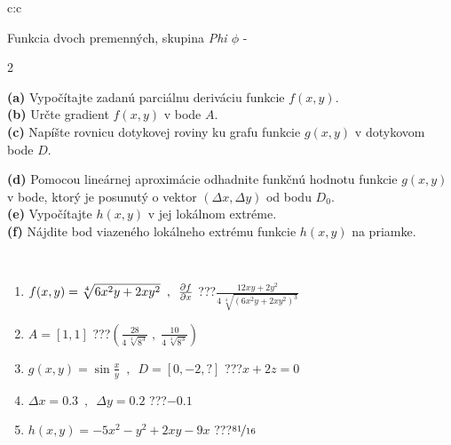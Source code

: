 \documentclass[10pt]{report}
\begin{document}
\begin{tabular}{c:c}
\begin{minipage}[c][104.5mm][t]{0.5\linewidth}
\begin{center}
\vspace{7mm}
{\huge \LARGE Funkcia dvoch premenných, skupina \textit{Phi $\phi$} -}\\[5mm]
\begin{minipage}{0.95\linewidth}
\begin{center}
{\small \begin{multicols}{2} \raggedright
\textbf{(a)} Vypočítajte zadanú parciálnu deriváciu funkcie \(f(x,y)\). \\[1mm]
\textbf{(b)} Určte gradient \(f(x,y)\) v bode \(A\). \\[1mm]
\textbf{(c)} Napíšte rovnicu dotykovej roviny ku grafu funkcie \(g(x,y)\) v dotykovom bode \(D\). \par \columnbreak
\textbf{(d)} Pomocou lineárnej aproximácie odhadnite funkčnú hodnotu funkcie \(g(x,y)\) v bode, ktorý je posunutý o vektor \((\Delta x, \Delta y)\) od bodu \(D_0\). \\[1mm]
\textbf{(e)} Vypočítajte \(h(x,y)\) v jej lokálnom extréme. \\[1mm]
\textbf{(f)} Nájdite bod viazeného lokálneho extrému funkcie \(h(x,y)\) na priamke. \\[1mm]
\end{multicols}
}
\end{center}
\end{minipage}
\\[4mm]
\begin{minipage}{0.79\linewidth}
\begin{center}
\begin{varwidth}{\linewidth}
\begin{enumerate}
\normalsizerr
\item $f(x,y) = \sqrt[4]{6x^2y + 2xy^2}\enspace , \enspace \pdv{f}{x}$\quad \dotfill\; ???\;\dotfill \quad $\frac{12xy+2y^2}{4\,\sqrt[4]{(6x^2y+2xy^2)^{3}}}$
\item $A = [1, 1]$\quad \dotfill\; ???\;\dotfill \quad $\left( \frac{28}{4\,\sqrt[4]{8^3}} \;,\; \frac{10}{4\,\sqrt[4]{8^3}} \right)$
\item $g(x,y) = \sin\frac{x}{y} \enspace , \enspace D = [0, -2, ?]$\quad \dotfill\; ???\;\dotfill \quad $x+2z=0$
\item $\Delta x = {0.3} \enspace,\enspace \Delta y = {0.2}$\quad \dotfill\; ???\;\dotfill \quad $-0.1$
\item $h(x,y) = -5x^2-y^2+2xy-9x$\quad \dotfill\; ???\;\dotfill \quad $\nicefrac{81}{16}$

\end{enumerate}
\end{varwidth}
\end{center}
\end{minipage}
\end{center}
\end{minipage}
\end{tabular}
\end{document}
